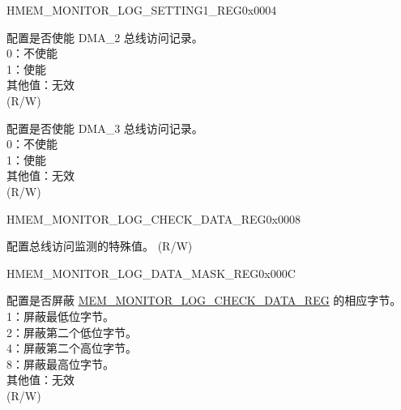 \begin{register}{H}{MEM\_MONITOR\_LOG\_SETTING1\_REG}{0x0004}\label{regdesc:MEMMONITORLOGSETTING1REG}
%
%
%
\regnewline%
\begin{regdesc}\begin{reglist}
\label{fielddesc:MEMMONITORLOGDMA2ENA}\item [MEM\_MONITOR\_LOG\_DMA\_2\_ENA] 配置是否使能 DMA\_2 总线访问记录。\\
0：不使能\\
1：使能\\
其他值：无效\\ (R/W)
\label{fielddesc:MEMMONITORLOGDMA3ENA}\item [MEM\_MONITOR\_LOG\_DMA\_3\_ENA] 配置是否使能 DMA\_3 总线访问记录。\\
0：不使能\\
1：使能\\
其他值：无效\\ (R/W)
\end{reglist}\end{regdesc}
\end{register}


\begin{register}{H}{MEM\_MONITOR\_LOG\_CHECK\_DATA\_REG}{0x0008}\label{regdesc:MEMMONITORLOGCHECKDATAREG}
%
\regnewline%
\begin{regdesc}\begin{reglist}
\label{fielddesc:MEMMONITORLOGCHECKDATA}\item [MEM\_MONITOR\_LOG\_CHECK\_DATA] 配置总线访问监测的特殊值。 (R/W)
\end{reglist}\end{regdesc}
\end{register}


\begin{register}{H}{MEM\_MONITOR\_LOG\_DATA\_MASK\_REG}{0x000C}\label{regdesc:MEMMONITORLOGDATAMASKREG}
%
%
\regnewline%
\begin{regdesc}\begin{reglist}
\label{fielddesc:MEMMONITORLOGDATAMASK}\item [MEM\_MONITOR\_LOG\_DATA\_MASK] 配置是否屏蔽 \hyperref[regdesc:MEMMONITORLOGCHECKDATAREG]{MEM\_MONITOR\_LOG\_CHECK\_DATA\_REG} 的相应字节。\\
1：屏蔽最低位字节。\\
2：屏蔽第二个低位字节。\\
4：屏蔽第二个高位字节。\\
8：屏蔽最高位字节。\\
其他值：无效\\ (R/W)
\end{reglist}\end{regdesc}
\end{register}


